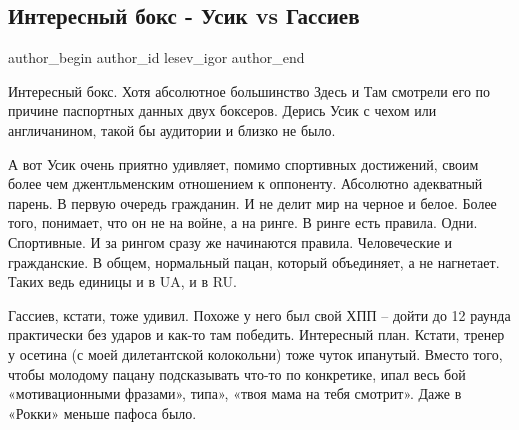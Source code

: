 
 
 
 
 
 
\subsection{Интересный бокс - Усик vs Гассиев}
\label{sec:22_07_2018.fb.lesev_igor.1.boks_usik_gassiev}
 
\ifcmt
 author_begin
   author_id lesev_igor
 author_end
\fi

Интересный бокс. Хотя абсолютное большинство Здесь и Там смотрели его по
причине паспортных данных двух боксеров. Дерись Усик с чехом или англичанином,
такой бы аудитории и близко не было.

А вот Усик очень приятно удивляет, помимо спортивных достижений, своим более
чем джентльменским отношением к оппоненту. Абсолютно адекватный парень. В
первую очередь гражданин. И не делит мир на черное и белое. Более того,
понимает, что он не на войне, а на ринге. В ринге есть правила. Одни.
Спортивные. И за рингом сразу же начинаются правила. Человеческие и
гражданские. В общем, нормальный пацан, который объединяет, а не нагнетает.
Таких ведь единицы и в UA, и в RU.

Гассиев, кстати, тоже удивил. Похоже у него был свой ХПП – дойти до 12 раунда
практически без ударов и как-то там победить. Интересный план. Кстати, тренер у
осетина (с моей дилетантской колокольни) тоже чуток ипанутый. Вместо того,
чтобы молодому пацану подсказывать что-то по конкретике, ипал весь бой
«мотивационными фразами», типа», «твоя мама на тебя смотрит». Даже в «Рокки»
меньше пафоса было.

